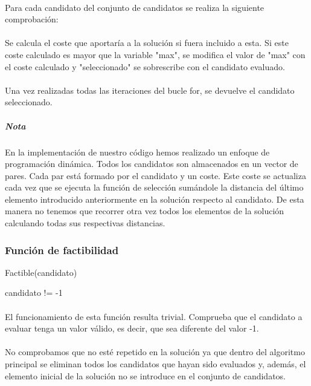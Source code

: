 \documentclass{article}
\begin{document}
	\paragraph{}Para cada candidato del conjunto de candidatos se realiza la siguiente comprobación:
	
	\paragraph{}Se calcula el coste que aportaría a la solución si fuera incluido a esta. Si este coste calculado es mayor que la variable "max", se modifica el valor de "max" con el coste calculado y "seleccionado" se sobrescribe con el candidato evaluado.
	
	\paragraph{}Una vez realizadas todas las iteraciones del bucle for, se devuelve el candidato seleccionado.
	
	\subparagraph{Nota}En la implementación de nuestro código hemos realizado un enfoque de programación dinámica. Todos los candidatos son almacenados en un vector de pares. Cada par está formado por el candidato y un coste. Este coste se actualiza cada vez que se ejecuta la función de selección sumándole la distancia del último elemento introducido anteriormente en la solución respecto al candidato. De esta manera no tenemos que recorrer otra vez todos los elementos de la solución calculando todas sus respectivas distancias.
	
	\subsubsection{Función de factibilidad}
	\begin{algorithm}[H]
		\caption{Factible(candidato)}
		\begin{algorithmic}
			\RETURN candidato != -1
		\end{algorithmic}
	\end{algorithm}
	
	\paragraph{}El funcionamiento de esta función resulta trivial. Comprueba que el candidato a evaluar tenga un valor válido, es decir, que sea diferente del valor -1. 
	
	\paragraph{}No comprobamos que no esté repetido en la solución ya que dentro del algoritmo principal se eliminan todos los candidatos que hayan sido evaluados y, además, el elemento inicial de la solución no se introduce en el conjunto de candidatos. 
	
\end{document}
